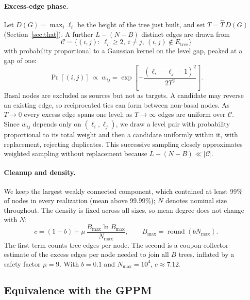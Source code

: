 \paragraph{Excess-edge phase.}
Let $D(G)=\max_i\ell_i$ be the height of the tree just built, and set
$T=\hat T\,D(G)$ (Section~\ref{sec:that}). A further $L-(N-B)$ distinct edges
are drawn from
\begin{equation}
  \mathcal C=\bigl\{(i,j):\ \ell_i\ge 2,\ i\ne j,\ (i,j)\notin E_{\mathrm{tree}}\bigr\}
  \label{eq:candidates}
\end{equation}
with probability proportional to a Gaussian kernel on the level gap, peaked at
a gap of one:
\begin{equation}
  \Pr[(i,j)]\ \propto\ w_{ij}=\exp\!\left[-\frac{(\ell_i-\ell_j-1)^2}{2T^2}\right].
  \label{eq:kernel}
\end{equation}
Basal nodes are excluded as sources but not as targets. A candidate may
reverse an existing edge, so reciprocated ties can form between non-basal
nodes. As $T\to0$ every excess edge spans one level; as $T\to\infty$ edges are
uniform over $\mathcal C$. Since $w_{ij}$ depends only on $(\ell_i,\ell_j)$, we
draw a level pair with probability proportional to its total weight and then a
candidate uniformly within it, with replacement, rejecting duplicates. This
successive sampling closely approximates weighted sampling without replacement
because $L-(N-B)\ll|\mathcal C|$.

\paragraph{Cleanup and density.}
We keep the largest weakly connected component, which contained at least 99\%
of nodes in every realization (mean above 99.99\%); $N$ denotes nominal size
throughout. The density is fixed across all sizes, so mean degree does not
change with $N$:
\begin{equation}
  c=(1-b)+\mu\,\frac{B_{\max}\ln B_{\max}}{N_{\max}},\qquad
  B_{\max}=\operatorname{round}(bN_{\max}).
  \label{eq:density}
\end{equation}
The first term counts tree edges per node. The second is a coupon-collector
estimate of the excess edges per node needed to join all $B$ trees, inflated
by a safety factor $\mu=9$. With $b=0.1$ and $N_{\max}=10^4$, $c\approx7.12$.

\subsection{Equivalence with the GPPM}
\label{sec:equivalence}

